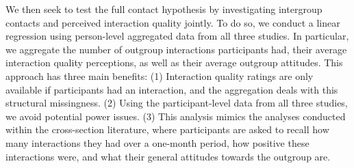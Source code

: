 \documentclass[man, 12pt, a4paper, mask]{apa7}
\theoremstyle{break}
\theoremstyle{plain}
\begin{document}
    
We then seek to test the full contact hypothesis by investigating intergroup contacts and perceived interaction quality jointly. To do so, we conduct a linear regression using person-level aggregated data from all three studies. In particular, we aggregate the number of outgroup interactions participants had, their average interaction quality perceptions, as well as their average outgroup attitudes. This approach has three main benefits: (1) Interaction quality ratings are only available if participants had an interaction, and the aggregation deals with this structural missingness. (2) Using the participant-level data from all three studies, we avoid potential power issues. (3) This analysis mimics the analyses conducted within the cross-section literature, where participants are asked to recall how many interactions they had over a one-month period, how positive these interactions were, and what their general attitudes towards the outgroup are.
\end{document}
